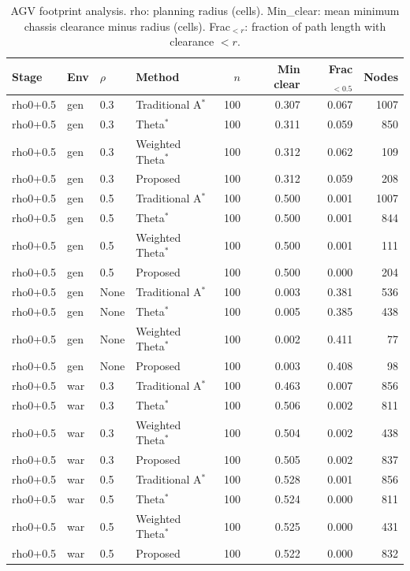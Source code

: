 \begin{table}[htbp]
\centering\small
\caption{AGV footprint analysis. rho: planning radius (cells). Min\_clear: mean minimum chassis clearance minus radius (cells). Frac$_{<r}$: fraction of path length with clearance $< r$.}\label{tab:footprint}
\begin{tabular}{llllrrrr}
\toprule
Stage & Env & $\rho$ & Method & $n$ & Min clear & Frac$_{<0.5}$ & Nodes \\
\midrule
rho0+0.5 & gen & 0.3 & Traditional A$^{*}$ & 100 & 0.307 & 0.067 & 1007 \\
rho0+0.5 & gen & 0.3 & Theta$^{*}$ & 100 & 0.311 & 0.059 & 850 \\
rho0+0.5 & gen & 0.3 & Weighted Theta$^{*}$ & 100 & 0.312 & 0.062 & 109 \\
rho0+0.5 & gen & 0.3 & Proposed & 100 & 0.312 & 0.059 & 208 \\
rho0+0.5 & gen & 0.5 & Traditional A$^{*}$ & 100 & 0.500 & 0.001 & 1007 \\
rho0+0.5 & gen & 0.5 & Theta$^{*}$ & 100 & 0.500 & 0.001 & 844 \\
rho0+0.5 & gen & 0.5 & Weighted Theta$^{*}$ & 100 & 0.500 & 0.001 & 111 \\
rho0+0.5 & gen & 0.5 & Proposed & 100 & 0.500 & 0.000 & 204 \\
rho0+0.5 & gen & None & Traditional A$^{*}$ & 100 & 0.003 & 0.381 & 536 \\
rho0+0.5 & gen & None & Theta$^{*}$ & 100 & 0.005 & 0.385 & 438 \\
rho0+0.5 & gen & None & Weighted Theta$^{*}$ & 100 & 0.002 & 0.411 & 77 \\
rho0+0.5 & gen & None & Proposed & 100 & 0.003 & 0.408 & 98 \\
rho0+0.5 & war & 0.3 & Traditional A$^{*}$ & 100 & 0.463 & 0.007 & 856 \\
rho0+0.5 & war & 0.3 & Theta$^{*}$ & 100 & 0.506 & 0.002 & 811 \\
rho0+0.5 & war & 0.3 & Weighted Theta$^{*}$ & 100 & 0.504 & 0.002 & 438 \\
rho0+0.5 & war & 0.3 & Proposed & 100 & 0.505 & 0.002 & 837 \\
rho0+0.5 & war & 0.5 & Traditional A$^{*}$ & 100 & 0.528 & 0.001 & 856 \\
rho0+0.5 & war & 0.5 & Theta$^{*}$ & 100 & 0.524 & 0.000 & 811 \\
rho0+0.5 & war & 0.5 & Weighted Theta$^{*}$ & 100 & 0.525 & 0.000 & 431 \\
rho0+0.5 & war & 0.5 & Proposed & 100 & 0.522 & 0.000 & 832 \\

\end{tabular}
\end{table}
